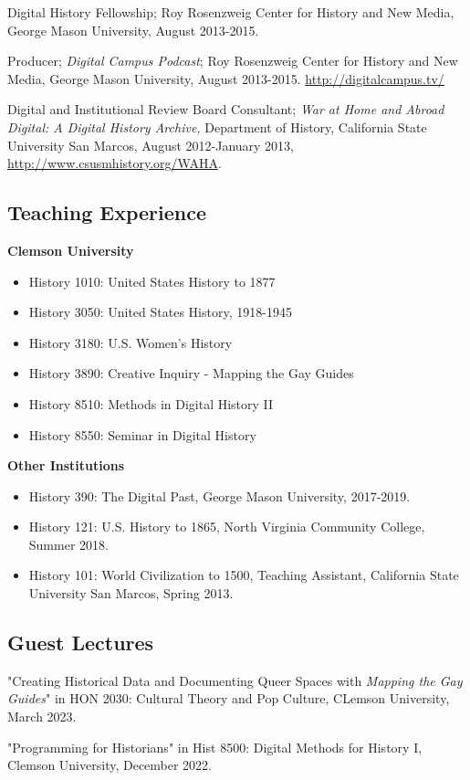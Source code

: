 \documentclass[11pt]{article}
\begin{document}
Digital History Fellowship; Roy Rosenzweig Center for History and New Media, George Mason University, August 2013-2015.

Producer; \emph{Digital Campus Podcast}; Roy Rosenzweig Center for History and New Media, George Mason University, August 2013-2015. \url{http://digitalcampus.tv/}

Digital and Institutional Review Board Consultant; \emph{War at Home and Abroad Digital: A Digital History Archive,} Department of History, California State University San Marcos, August 2012-January 2013, \url{http://www.csusmhistory.org/WAHA}.

\subsection{Teaching Experience}

\textbf{Clemson University}
\begin{itemize}
  \itemsep0em 
  \item History 1010: United States History to 1877
  \item History 3050: United States History, 1918-1945
  \item History 3180: U.S. Women's History
  \item History 3890: Creative Inquiry - Mapping the Gay Guides
  \item History 8510: Methods in Digital History II
  \item History 8550: Seminar in Digital History
\end{itemize}
\textbf{Other Institutions}
\begin{itemize}
  \itemsep0em 
  \item History 390: The Digital Past, George Mason University, 2017-2019.
  \item History 121: U.S. History to 1865, North Virginia Community College, Summer 2018.
  \item History 101: World Civilization to 1500, Teaching Assistant, California State University San Marcos, Spring 2013.
\end{itemize}

\subsection{Guest Lectures}
"Creating Historical Data and Documenting Queer Spaces with \emph{Mapping the Gay Guides}" in HON 2030: Cultural Theory and Pop Culture, CLemson University, March 2023.

"Programming for Historians" in Hist 8500: Digital Methods for History I, Clemson University, December 2022.
\end{document}
